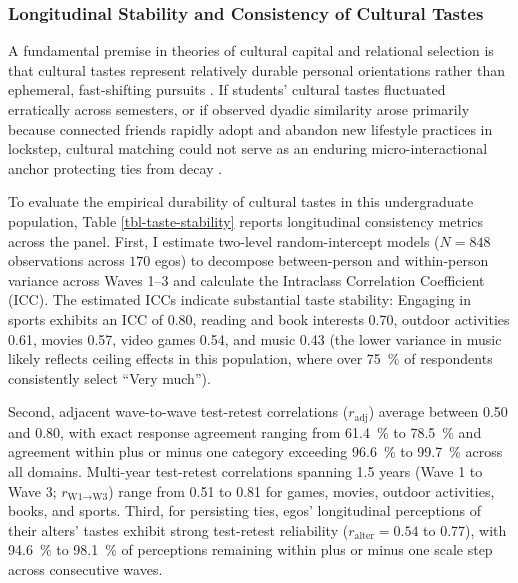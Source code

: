 \documentclass[12pt,letterpaper]{article}
\def\percent{\%}%
\begin{document}
\subsubsection{Longitudinal Stability and Consistency of Cultural Tastes}\label{taste-stability}

A fundamental premise in theories of cultural capital and relational selection is that cultural tastes represent relatively durable personal orientations rather than ephemeral, fast-shifting pursuits \citep{lizardo2006}. If students' cultural tastes fluctuated erratically across semesters, or if observed dyadic similarity arose primarily because connected friends rapidly adopt and abandon new lifestyle practices in lockstep, cultural matching could not serve as an enduring micro-interactional anchor protecting ties from decay \citep{vaisey2010}. 

To evaluate the empirical durability of cultural tastes in this undergraduate population, Table \ref{tbl-taste-stability} reports longitudinal consistency metrics across the panel. First, I estimate two-level random-intercept models ($N = 848$ observations across $170$ egos) to decompose between-person and within-person variance across Waves 1--3 and calculate the Intraclass Correlation Coefficient (ICC). The estimated ICCs indicate substantial taste stability: Engaging in sports exhibits an ICC of \num{0.80}, reading and book interests \num{0.70}, outdoor activities \num{0.61}, movies \num{0.57}, video games \num{0.54}, and music \num{0.43} (the lower variance in music likely reflects ceiling effects in this population, where over \SI{75}{\percent} of respondents consistently select ``Very much''). 



Second, adjacent wave-to-wave test-retest correlations ($r_{\text{adj}}$) average between \num{0.50} and \num{0.80}, with exact response agreement ranging from \SI{61.4}{\percent} to \SI{78.5}{\percent} and agreement within plus or minus one category exceeding \SI{96.6}{\percent} to \SI{99.7}{\percent} across all domains. Multi-year test-retest correlations spanning 1.5 years (Wave 1 to Wave 3; $r_{\text{W1}\to\text{W3}}$) range from \num{0.51} to \num{0.81} for games, movies, outdoor activities, books, and sports. Third, for persisting ties, egos' longitudinal perceptions of their alters' tastes exhibit strong test-retest reliability ($r_{\text{alter}} = \num{0.54}$ to \num{0.77}), with \SI{94.6}{\percent} to \SI{98.1}{\percent} of perceptions remaining within plus or minus one scale step across consecutive waves. 
\end{document}
